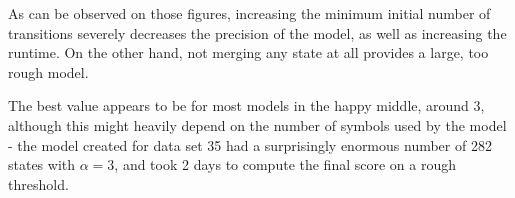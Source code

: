 \documentclass[
10pt, %
a4paper, %
oneside, %
headinclude,footinclude, %
BCOR5mm, %
]{scrartcl}
\begin{document}
%		
%		
%		
%		
%
%		
%		

As can be observed on those figures, increasing the minimum initial number of transitions severely decreases the precision of the model, as well as increasing the runtime. On the other hand, not merging any state at all provides a large, too rough model.

The best value appears to be for most models in the happy middle, around 3, although this might heavily depend on the number of symbols used by the model - the model created for data set 35 had a surprisingly enormous number of 282 states with $\alpha = 3$, and took 2 days to compute the final score on a rough threshold.
\end{document}
